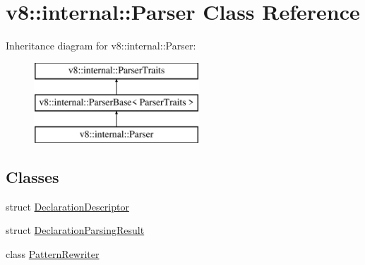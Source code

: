 \hypertarget{classv8_1_1internal_1_1_parser}{}\section{v8\+:\+:internal\+:\+:Parser Class Reference}
\label{classv8_1_1internal_1_1_parser}
Inheritance diagram for v8\+:\+:internal\+:\+:Parser\+:\begin{figure}[H]
\begin{center}
\leavevmode
\includegraphics[height=3.000000cm]{classv8_1_1internal_1_1_parser}
\end{center}
\end{figure}
\subsection*{Classes}
\begin{DoxyCompactItemize}
\item 
struct \hyperlink{structv8_1_1internal_1_1_parser_1_1_declaration_descriptor}{Declaration\+Descriptor}
\item 
struct \hyperlink{structv8_1_1internal_1_1_parser_1_1_declaration_parsing_result}{Declaration\+Parsing\+Result}
\item 
class \hyperlink{classv8_1_1internal_1_1_parser_1_1_pattern_rewriter}{Pattern\+Rewriter}
\end{DoxyCompactItemize}
